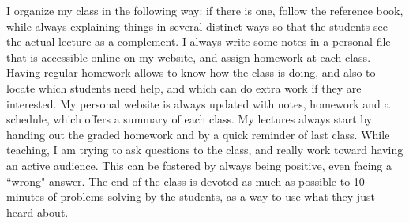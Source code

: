 \documentclass[a4paper]{article}
\begin{document}
I organize my class in the following way: if there is one, follow the reference book, while always explaining things in several distinct ways so that the students see the actual lecture as a complement. I always write some notes in a personal file that is accessible online on my website, and assign homework at each class. Having regular homework allows to know how the class is doing, and also to locate which students need help, and which can do extra work if they are interested. My personal website is always updated with notes, homework and a schedule, which offers a summary of each class. My lectures always start by handing out the graded homework and by a quick reminder of last class. While teaching, I am trying to ask questions to the class, and really work toward having an active audience. This can be fostered by always being positive, even facing a ``wrong" answer. The end of the class is devoted as much as possible to 10 minutes of problems solving by the students, as a way to use what they just heard about.\\
   
\end{document}
